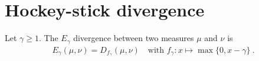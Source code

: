 \chapter{Hockey-stick divergence}

\begin{definition}
  \label{def:eGamma}
  Let $\gamma \ge 1$. The $E_\gamma$ divergence between two measures $\mu$ and $\nu$ is
  \begin{align*}
  E_\gamma(\mu, \nu) = D_{f_\gamma}(\mu, \nu) \quad \text{with } f_\gamma: x \mapsto \max\{0, x - \gamma\} \: .
  \end{align*}
\end{definition}
